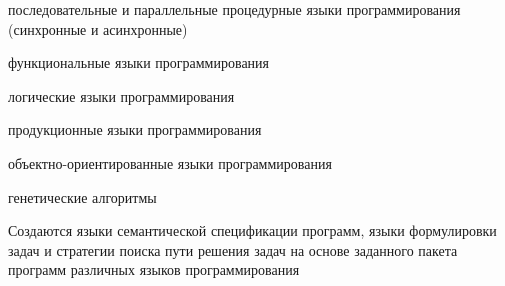 \begin{scnsubstruct}
{\begin{scnitemize}
{\begin{scnitemize}
                \item{последовательные и параллельные процедурные языки программирования (синхронные и асинхронные)}
                \item{функциональные языки программирования}
                \item{логические языки программирования}
                \item{продукционные языки программирования}
                \item{объектно-ориентированные языки программирования}
                \item{генетические алгоритмы}
            \end{scnitemize}
        }
        \item{Создаются языки семантической спецификации программ, языки формулировки задач и стратегии поиска
            пути решения задач на основе заданного пакета программ различных языков программирования}
    \end{scnitemize}
    }
\end{scnsubstruct}